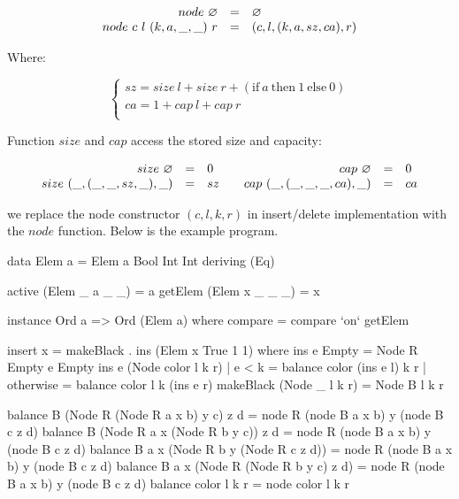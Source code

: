 \documentclass[b5paper]{article}
\begin{document}
\begin{Answer}[ref = {ex:mark-rebuild}]
{\[
\begin{array}{rcl}
node\ \varnothing & = & \varnothing \\
node\ c\ l\ (k, a, \_, \_)\ r & = & (c, l, (k, a, sz, ca), r) \\
\end{array}
\]

Where:

\[
\begin{cases}
sz = size\ l + size\ r + (\text{if}\ a\ \text{then}\ 1\ \text{else}\ 0) \\
ca = 1 + cap\ l + cap\ r \\
\end{cases}
\]

Function $size$ and $cap$ access the stored size and capacity:

\[
\begin{array}{cc}
  \begin{array}{rcl}
  size\ \varnothing & = & 0 \\
  size\ (\_, (\_, \_, sz, \_), \_) & = & sz \\
  \end{array}
&
  \begin{array}{rcl}
  cap\ \varnothing & = & 0 \\
  cap\ (\_, (\_, \_, \_, ca), \_) & = & ca \\
  \end{array}
\end{array}
\]

we replace the node constructor $(c, l, k, r)$ in insert/delete implementation with the $node$ function. Below is the example program.

\begin{Haskell}
data Elem a = Elem a Bool Int Int deriving (Eq)

active (Elem _ a _ _) = a
getElem (Elem x _ _ _) = x

instance Ord a => Ord (Elem a) where
  compare = compare `on` getElem

insert x = makeBlack . ins (Elem x True 1 1) where
    ins e Empty = Node R Empty e Empty
    ins e (Node color l k r)
        | e < k     = balance color (ins e l) k r
        | otherwise = balance color l k (ins e r)
    makeBlack (Node _ l k r) = Node B l k r

balance B (Node R (Node R a x b) y c) z d = node R (node B a x b) y (node B c z d)
balance B (Node R a x (Node R b y c)) z d = node R (node B a x b) y (node B c z d)
balance B a x (Node R b y (Node R c z d)) = node R (node B a x b) y (node B c z d)
balance B a x (Node R (Node R b y c) z d) = node R (node B a x b) y (node B c z d)
balance color l k r = node color l k r


\end{Haskell}}
\end{Answer}
\end{document}
